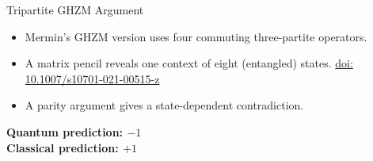 \documentclass[xcolor=dvipsnames]{beamer}
\newenvironment{slideitems}{%
  \begin{itemize}\setlength{\itemsep}{0.55em}\setlength{\parskip}{0pt}%
}{\end{itemize}}
\begin{document}
\begin{frame}{Tripartite GHZM Argument}
\begin{slideitems}
  \item Mermin's GHZM version uses four commuting three-partite operators.
  \item A matrix pencil reveals one context of eight (entangled) states.
\href{https://doi.org/10.1007/s10701-021-00515-z}{doi: 10.1007/s10701-021-00515-z} \\
  \item A parity argument gives a state-dependent contradiction.
\end{slideitems}

\centering
\Large
\textbf{Quantum prediction: $-1$}\\[1mm]
\textbf{Classical prediction: $+1$}
\end{frame}
\end{document}
